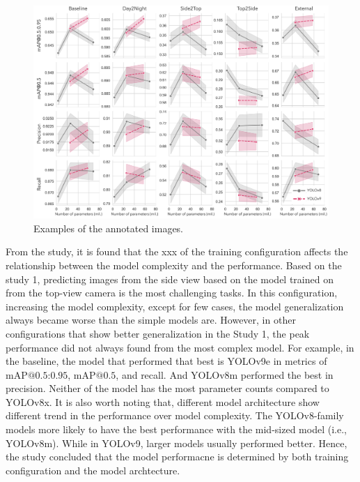 \begin{figure}[H]
    \centering
    \includegraphics[width=1\textwidth]{figure_4.jpg}
    \caption{Examples of the annotated images.}
    \label{fig:models}
\end{figure}


From the study, it is found that the xxx of the training configuration affects the relationship between the model complexity and the performance. Based on the study 1, predicting images from the side view based on the model trained on from the top-view camera is the most challenging tasks. In this configuration, increasing the model complexity, except for few cases, the model generalization always became worse than the simple models are. However, in other configurations that show better generalization in the Study 1, the peak performance did not always found from the most complex model. For example, in the baseline, the model that performed that best is YOLOv9e in metrics of $\text{mAP@{0.5:0.95}}$, $\text{mAP@{0.5}}$, and recall. And YOLOv8m performed the best in precision. Neither of the model has the most parameter counts compared to YOLOv8x. It is also worth noting that, different model architecture show different trend in the performance over model complexity. The YOLOv8-family models more likely to have the best performance with the mid-sized model (i.e., YOLOv8m). While in YOLOv9, larger models usually performed better. Hence, the study concluded that the model performacne is determined by both training configuration and the model archtecture.

